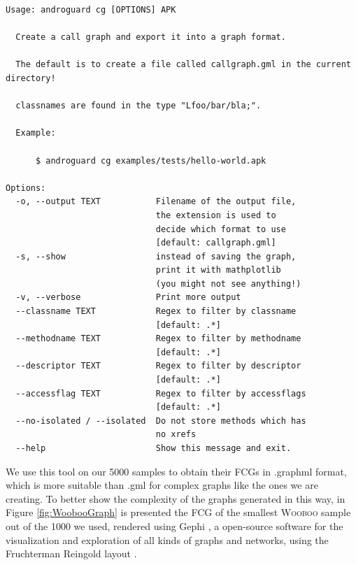 \begin{center}
\begin{lstlisting}[style=androguard]
Usage: androguard cg [OPTIONS] APK

  Create a call graph and export it into a graph format.

  The default is to create a file called callgraph.gml in the current directory!

  classnames are found in the type "Lfoo/bar/bla;".

  Example:

      $ androguard cg examples/tests/hello-world.apk

Options:
  -o, --output TEXT           Filename of the output file,
                              the extension is used to 
                              decide which format to use  
                              [default: callgraph.gml]
  -s, --show                  instead of saving the graph, 
                              print it with mathplotlib 
                              (you might not see anything!)
  -v, --verbose               Print more output
  --classname TEXT            Regex to filter by classname  
                              [default: .*]
  --methodname TEXT           Regex to filter by methodname  
                              [default: .*]
  --descriptor TEXT           Regex to filter by descriptor  
                              [default: .*]
  --accessflag TEXT           Regex to filter by accessflags  
                              [default: .*]
  --no-isolated / --isolated  Do not store methods which has 
                              no xrefs
  --help                      Show this message and exit.
\end{lstlisting}
\end{center}

\noindent We use this tool on our 5000 samples to obtain their FCGs in .graphml format, which is more suitable than .gml for complex graphs like the ones we are creating. To better show the complexity of the graphs generated in this way, in Figure \ref{fig:WoobooGraph} is presented the FCG of the smallest \textsc{Wooboo} sample out of the 1000 we used, rendered using Gephi \cite{bastian2009gephi}, a open-source software for the visualization and exploration of all kinds of graphs and networks, using the Fruchterman Reingold layout \cite{fruchterman1991graph}.

